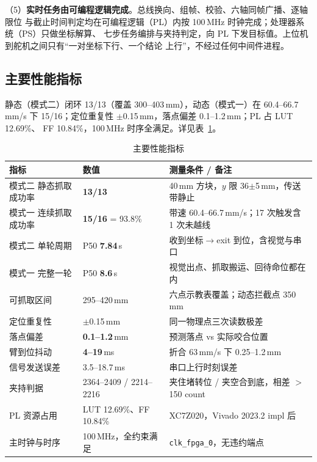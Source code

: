 \documentclass[UTF8,a4paper,zihao=5,fontset=windows]{ctexart}
\newcommand{\code}[1]{\texttt{\small #1}}
\begin{document}
（5）\textbf{实时任务由可编程逻辑完成}。总线换向、组帧、校验、六轴同帧广播、逐轴限位
与截止时间判定均在可编程逻辑（PL）内按 100\,MHz 时钟完成；处理器系统（PS）只做坐标解算、
七步任务编排与夹持判定，向 PL 下发目标值。上位机到舵机之间只有“一对坐标下行、一个结论
上行”，不经过任何中间件进程。

\subsection{主要性能指标}

静态（模式二）闭环 13/13（覆盖 300--403\,mm），动态（模式一）在 60.4--66.7\,mm/s
下 15/16；定位重复性 $\pm$0.15\,mm，落点偏差 0.1--1.2\,mm；PL 占 LUT 12.69\%、
FF 10.84\%，100\,MHz 时序全满足。详见表~\ref{tab:perf}。

\begin{table}[H]\centering\small
\caption{主要性能指标}
\label{tab:perf}
\begin{tabularx}{\linewidth}{@{}p{3.3cm}p{3.7cm}X@{}}
\toprule
指标 & 数值 & 测量条件 / 备注 \\
\midrule
模式二 静态抓取成功率 & \textbf{13/13} & 40\,mm 方块，$y$ 限 36$\pm$5\,mm，传送带静止 \\
模式一 连续抓取成功率 & \textbf{15/16} = 93.8\% & 带速 60.4--66.7\,mm/s；17 次触发含 1 次未越线 \\
模式二 单轮周期 & P50 \textbf{7.84}\,s & 收到坐标$\rightarrow$exit 到位，含视觉与串口 \\
模式一 完整一轮 & P50 \textbf{8.6}\,s & 视觉出点、抓取搬运、回待命位都在内 \\
可抓取区间 & 295--420\,mm & 六点示教表覆盖；动态拦截点 350\,mm \\
定位重复性 & $\pm$0.15\,mm & 同一物理点三次读数极差 \\
落点偏差 & \textbf{0.1--1.2}\,mm & 预测落点 vs 实际咬合位置 \\
臂到位抖动 & \textbf{4--19}\,ms & 折合 63\,mm/s 下 0.25--1.2\,mm \\
信号发送误差 & 3.5--18.7\,ms & 串口上行时刻误差 \\
夹持判据 & 2364--2409 / 2214--2216 & 夹住堵转位 / 夹空合到底，相差 $>$150 count \\
PL 资源占用 & LUT 12.69\%、FF 10.84\% & XC7Z020，Vivado 2023.2 impl 后 \\
主时钟与时序 & 100\,MHz，全约束满足 & \code{clk\_fpga\_0}，无违约端点 \\
\bottomrule
\end{tabularx}
\end{table}
\end{document}
